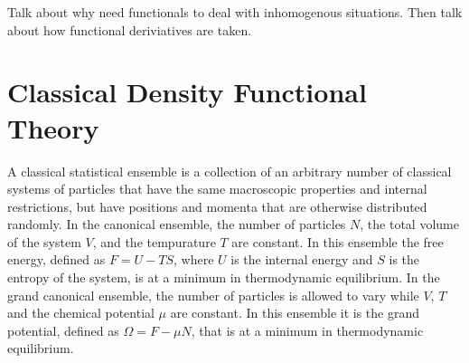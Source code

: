 
Talk about why need functionals to deal with inhomogenous situations.
Then talk about how functional deriviatives are taken.


\section{Classical Density Functional Theory}

A classical statistical ensemble is a collection of an arbitrary
number of classical systems of particles that have the same
macroscopic properties and internal restrictions, but have positions
and momenta that are otherwise distributed randomly.  In the canonical
ensemble, the number of particles $N$, the total volume of the system
$V$, and the tempurature $T$ are constant.  In this ensemble the free
energy, defined as $F = U - TS$, where $U$ is the internal energy and
$S$ is the entropy of the system, is at a minimum in thermodynamic
equilibrium. In the grand canonical ensemble, the number of particles
is allowed to vary while $V$, $T$ and the chemical potential $\mu$ are
constant.  In this ensemble it is the grand potential, defined as
$\Omega = F - \mu N$, that is at a minimum in thermodynamic
equilibrium.


